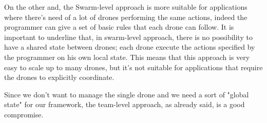 On the other and, the Swarm-level approach is more suitable for applications where there’s need of a lot of drones performing the same actions, indeed the programmer can give a set of basic rules that each drone can follow. It is important to underline that, in swarm-level approach, there is no possibility to have a shared state between drones; each drone execute the actions specified by the programmer on his own local state. This means that this approach is very easy to scale up to many drones, but it’s not suitable for applications that require the drones to explicitly coordinate.

Since we don't want to manage the single drone and we need a sort of "global state" for our framework, the team-level approach, as already said, is a good compromise.


